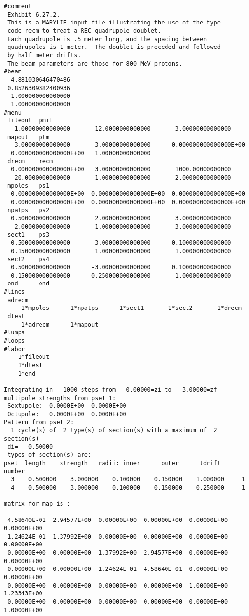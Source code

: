 \begin{footnotesize}
\begin{verbatim}
#comment
 Exhibit 6.27.2.
 This is a MARYLIE input file illustrating the use of the type
 code recm to treat a REC quadrupole doublet.
 Each quadrupole is .5 meter long, and the spacing between
 quadrupoles is 1 meter.  The doublet is preceded and followed
 by half meter drifts.
 The beam parameters are those for 800 MeV protons.
#beam
  4.881030646470486
 0.8526309382400936
  1.000000000000000
  1.000000000000000
#menu
 fileout  pmif
   1.00000000000000       12.0000000000000       3.00000000000000
 mapout   ptm
   3.00000000000000       3.00000000000000      0.000000000000000E+00
  0.000000000000000E+00   1.00000000000000
 drecm    recm
  0.000000000000000E+00   3.00000000000000       1000.00000000000
   20.0000000000000       1.00000000000000       2.00000000000000
 mpoles   ps1
  0.000000000000000E+00  0.000000000000000E+00  0.000000000000000E+00
  0.000000000000000E+00  0.000000000000000E+00  0.000000000000000E+00
 npatps   ps2
  0.500000000000000       2.00000000000000       3.00000000000000
   2.00000000000000       1.00000000000000       3.00000000000000
 sect1    ps3
  0.500000000000000       3.00000000000000      0.100000000000000
  0.150000000000000       1.00000000000000       1.00000000000000
 sect2    ps4
  0.500000000000000      -3.00000000000000      0.100000000000000
  0.150000000000000      0.250000000000000       1.00000000000000
 end      end
#lines
 adrecm
     1*mpoles      1*npatps      1*sect1       1*sect2       1*drecm
 dtest
     1*adrecm      1*mapout
#lumps
#loops
#labor
    1*fileout
    1*dtest
    1*end

Integrating in   1000 steps from   0.00000=zi to   3.00000=zf
multipole strengths from pset 1:
 Sextupole:  0.0000E+00  0.0000E+00
 Octupole:   0.0000E+00  0.0000E+00
Pattern from pset 2:
  1 cycle(s) of  2 type(s) of section(s) with a maximum of  2 section(s)
 di=   0.50000
 types of section(s) are:
pset  length    strength   radii: inner      outer      tdrift    number
  3    0.500000    3.000000    0.100000    0.150000    1.000000     1
  4    0.500000   -3.000000    0.100000    0.150000    0.250000     1

matrix for map is :

 4.58640E-01  2.94577E+00  0.00000E+00  0.00000E+00  0.00000E+00  0.00000E+00
-1.24624E-01  1.37992E+00  0.00000E+00  0.00000E+00  0.00000E+00  0.00000E+00
 0.00000E+00  0.00000E+00  1.37992E+00  2.94577E+00  0.00000E+00  0.00000E+00
 0.00000E+00  0.00000E+00 -1.24624E-01  4.58640E-01  0.00000E+00  0.00000E+00
 0.00000E+00  0.00000E+00  0.00000E+00  0.00000E+00  1.00000E+00  1.23343E+00
 0.00000E+00  0.00000E+00  0.00000E+00  0.00000E+00  0.00000E+00  1.00000E+00


\end{verbatim}
\end{footnotesize}
